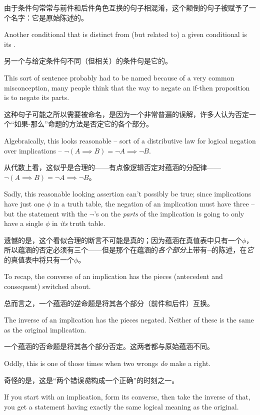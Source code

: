 由于条件句常常与前件和后件角色互换的句子相混淆，这个颠倒的句子被赋予了一个名字：它是原始陈述的。

Another conditional that is distinct from 
(but related to) a given conditional is its .

另一个与给定条件句不同（但相关）的条件句是它的。

This sort of sentence probably had to be named because of a very common 
misconception, many people think that the way to negate an if-then 
proposition is to negate
its parts.

这种句子可能之所以需要被命名，是因为一个非常普遍的误解，许多人认为否定一个“如果-那么”命题的方法是否定它的各个部分。

Algebraically, this looks reasonable -- sort of a distributive
law for logical negation over implications -- ${\lnot}( A \implies B) =
{\lnot}A \implies {\lnot}B$.

从代数上看，这似乎是合理的——有点像逻辑否定对蕴涵的分配律——${\lnot}( A \implies B) = {\lnot}A \implies {\lnot}B$。

Sadly, this reasonable looking assertion
can't possibly be true; since implications have just one $\phi$ in a truth 
table, the negation of an implication  must have three -- but the statement 
with the $\lnot$'s on the {\em parts} of the implication is going to only have 
a single $\phi$ in {\em its} truth table.

遗憾的是，这个看似合理的断言不可能是真的；因为蕴涵在真值表中只有一个$\phi$，所以蕴涵的否定必须有三个——但是那个在蕴涵的{\em 各个部分}上带有$\lnot$的陈述，在{\em 它}的真值表中将只有一个$\phi$。

To recap, the converse of an implication has the pieces (antecedent and 
consequent) switched about.

总而言之，一个蕴涵的逆命题是将其各个部分（前件和后件）互换。

The inverse of an implication has the 
pieces negated.  Neither of these is the same as the original implication.

一个蕴涵的否命题是将其各个部分否定。这两者都与原始蕴涵不同。

Oddly, this is one of those times when two wrongs {\em do} make a right.

奇怪的是，这是“两个错误{\em 能}构成一个正确”的时刻之一。

If you start with an implication, form its converse, then take the inverse
of that, you get a statement having exactly the same logical meaning
as the original.

